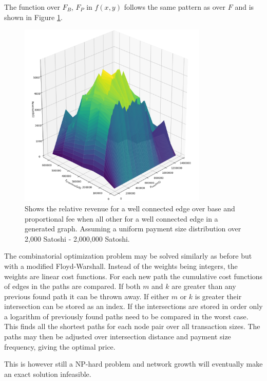 The function over $F_B$, $F_P$ in $f(x,y)$ follows the same pattern as over $F$ and is shown in Figure \ref{fig:cost:function:space}.

\begin{figure}[!htb]
	\vspace*{-0.0cm}
	\hspace*{0cm} 
	\centering
	\includegraphics[width=9cm]{plots/price.png}
	\caption{Shows the relative revenue for a well connected edge over base and proportional fee when all other for a well connected edge in a generated graph. Assuming a uniform payment size distribution over 2,000 Satoshi - 2,000,000 Satoshi. }
	\label{fig:cost:function:space}
	\hspace*{2mm} 
\end{figure}

The combinatorial optimization problem may be solved similarly as before but with a modified Floyd-Warshall. Instead of the weights being integers, the weights are linear cost functions. For each new path the cumulative cost functions of edges in the paths are compared. If both $m$ and $k$ are greater than any previous found path it can be thrown away. If either $m$ or $k$ is greater their intersection can be stored as an index. If the intersections are stored in order only a logarithm of previously found paths need to be compared in the worst case. This finds all the shortest paths for each \gls{node} pair over all transaction sizes. The \gls{path}s may then be adjusted over intersection distance and payment size frequency, giving the optimal price.

This is however still a NP-hard problem and network growth will eventually make an exact solution infeasible. 

